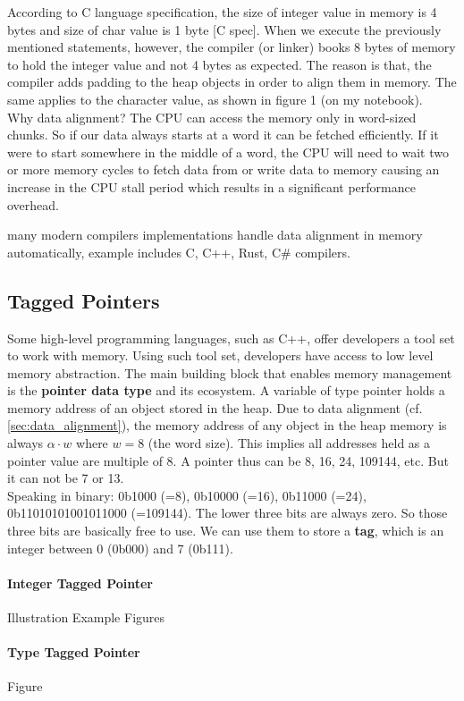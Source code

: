 According to C language specification, the size of integer value in memory is 4 bytes and size of char value is 1 byte [C spec]. When we execute the previously mentioned statements, however, the compiler (or linker) books 8 bytes of memory to hold the integer value and not 4 bytes as expected. The reason is that, the compiler adds padding to the heap objects in order to align them in memory. The same applies to the character value, as shown in figure 1 (on my notebook).  \\

Why data alignment? The CPU can access the memory only in word-sized chunks. So if our data always starts at a word it can be fetched efficiently. If it were to start somewhere in the middle of a word, the CPU will need to wait two or more memory cycles to fetch data from or write data to memory causing an increase in the CPU stall period which results in a significant performance overhead. 


many modern compilers implementations handle data alignment in memory automatically, example includes C, C++, Rust, C\# compilers.

\subsection{Tagged Pointers}
Some high-level programming languages, such as C++, offer developers a tool set to work with memory. Using such tool set, developers have access to low level memory abstraction. The main building block that enables memory management is the \textbf{pointer data type} and its ecosystem. A variable of type pointer holds a memory address of an object stored in the heap. Due to data alignment (cf. \ref{sec:data_alignment}), the memory address of any object in the heap memory is always $\alpha\cdot w$ where $w=8$ (the word size). This implies all addresses held as a pointer value are multiple of 8. A pointer thus can be 8, 16, 24, 109144, etc. But it can not be 7 or 13. \\

Speaking in binary: 0b1000 (=8), 0b10000 (=16), 0b11000 (=24), 0b11010101001011000 (=109144). The lower three bits are always zero. So those three bits are basically free to use. We can use them to store a \textbf{tag}, which is an integer between 0 (0b000) and 7 (0b111).


\paragraph{Integer Tagged Pointer} Illustration Example 
Figures
\paragraph{Type Tagged Pointer} 
Figure
